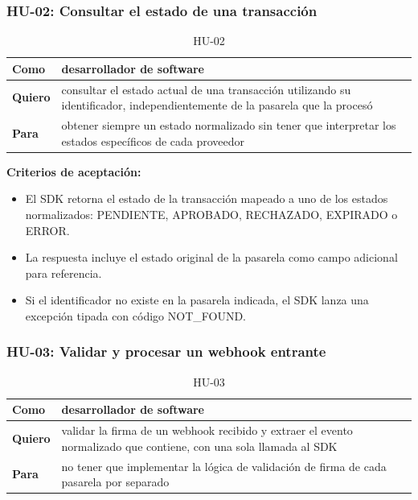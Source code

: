 \documentclass[10pt]{article}
\begin{document}
\subsubsection{HU-02: Consultar el estado de una transacción}
\begin{table}[htbp]
  \centering
  \renewcommand{\arraystretch}{1.2}
  \begin{tabularx}{\textwidth}{|l|X|}
    \hline
    \textbf{Como} & desarrollador de software \\
    \hline
    \textbf{Quiero} & consultar el estado actual de una transacción utilizando su identificador, independientemente de la pasarela que la procesó \\
    \hline
    \textbf{Para} & obtener siempre un estado normalizado sin tener que interpretar los estados específicos de cada proveedor \\
    \hline
  \end{tabularx}
  \caption{HU-02}
  \label{tab:hu-02}
\end{table}

\textbf{Criterios de aceptación:}
\begin{itemize}
  \item El SDK retorna el estado de la transacción mapeado a uno de los estados normalizados: PENDIENTE, APROBADO, RECHAZADO, EXPIRADO o ERROR.
  \item La respuesta incluye el estado original de la pasarela como campo adicional para referencia.
  \item Si el identificador no existe en la pasarela indicada, el SDK lanza una excepción tipada con código NOT\_FOUND.
\end{itemize}

\subsubsection{HU-03: Validar y procesar un webhook entrante}
\begin{table}[htbp]
  \centering
  \renewcommand{\arraystretch}{1.2}
  \begin{tabularx}{\textwidth}{|l|X|}
    \hline
    \textbf{Como} & desarrollador de software \\
    \hline
    \textbf{Quiero} & validar la firma de un webhook recibido y extraer el evento normalizado que contiene, con una sola llamada al SDK \\
    \hline
    \textbf{Para} & no tener que implementar la lógica de validación de firma de cada pasarela por separado \\
    \hline
  \end{tabularx}
  \caption{HU-03}
  \label{tab:hu-03}
\end{table}
\end{document}
